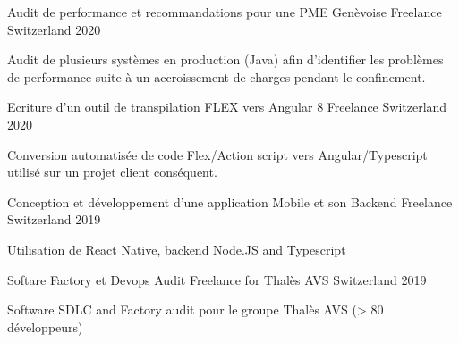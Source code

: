 

\begin{cventries}
\cventry
{Audit de performance et recommandations pour une PME Genèvoise} %
{Freelance} %
{Switzerland} %
{2020} %
{
  \begin{cvitems} %
    \item Audit de plusieurs systèmes en production (Java) afin d'identifier les problèmes de performance suite à un accroissement de charges pendant le confinement.
  \end{cvitems}
}
\cventry
{Ecriture d'un outil de transpilation FLEX vers Angular 8} %
{Freelance} %
{Switzerland} %
{2020} %
{
  \begin{cvitems} %
    \item Conversion automatisée de code Flex/Action script vers Angular/Typescript utilisé sur un projet client conséquent.
  \end{cvitems}
}

\cventry
{Conception et développement d'une application Mobile et son Backend} %
{Freelance} %
{Switzerland} %
{2019} %
{
  \begin{cvitems} %
  \item {Utilisation de React Native, backend Node.JS and Typescript}
  \end{cvitems}
}

\cventry
{Softare Factory et Devops Audit} %
{Freelance for Thalès AVS} %
{Switzerland} %
{2019} %
{
  \begin{cvitems} %
  \item {Software SDLC and Factory audit pour le groupe Thalès AVS (> 80 développeurs)}
  \end{cvitems}
}


\end{cventries}

